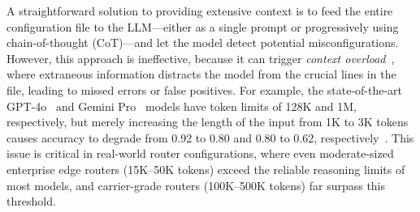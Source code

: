 A straightforward solution to providing extensive context is to feed the entire
configuration file to the LLM—either as a single prompt or progressively using chain-of-thought (CoT)—and let the model detect potential misconfigurations. 
However, this approach is ineffective, because it can trigger \emph{context overload}~\cite{lican,li2024long,qian2024long}, where extraneous information distracts the model from the crucial lines in the file, leading to missed errors or false positives.  
For example, the state-of-the-art GPT-4o~\cite{achiam2023gpt} and Gemini Pro~\cite{google2024gemini} models have token limits of 128K and 1M, respectively, but merely increasing the length of the input from 1K to 3K tokens causes accuracy to degrade from 0.92 to 0.80 and 0.80 to 0.62, respectively~\cite{levy2024same}.
This issue is critical in real-world router configurations, where even moderate-sized enterprise edge routers (15K–50K tokens) exceed the reliable reasoning limits of most models, and carrier-grade routers (100K–500K tokens) far surpass this threshold.

